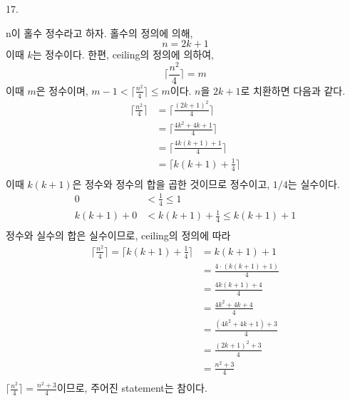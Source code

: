 \documentclass{article}
\begin{document}
17.
\begin{addmargin}[1em]{2em}
n이 홀수 정수라고 하자. 홀수의 정의에 의해,
\[n = 2k + 1\]
이때 $k$는 정수이다.
한편, ceiling의 정의에 의하여,
\[\lceil \frac{n^2}{4} \rceil = m \]
이때 $m$은 정수이며, $m - 1 < \lceil \frac{n^2}{4} \rceil \le m$이다.
$n$을 $2k+1$로 치환하면 다음과 같다.
\begin{align*}
    \lceil \frac{n^2}{4} \rceil &= \lceil \frac{(2k+1)^2}{4} \rceil \\
    &=\lceil \frac{4k^2+4k+1}{4} \rceil \\
    &=\lceil \frac{4k(k+1)+1}{4} \rceil \\
    &=\lceil k(k+1) + \frac{1}{4} \rceil \\
\end{align*}
이때 $k(k+1)$은 정수와 정수의 합을 곱한 것이므로 정수이고, $1/4$는 실수이다.
\begin{align*}
    0 &< \frac{1}{4} \le 1 \\
    k(k+1)+ 0 &< k(k+1) + \frac{1}{4} \le k(k+1)+1 \\
\end{align*}
정수와 실수의 합은 실수이므로, ceiling의 정의에 따라
\begin{align*}
    \lceil \frac{n^2}{4} \rceil = \lceil k(k+1) + \frac{1}{4} \rceil &= k(k+1) + 1 \\
    &= \frac{4\cdot(k(k+1)+1)}{4} \\
    &= \frac{4k(k+1)+4}{4} \\
    &= \frac{4k^2+4k+4}{4} \\
    &= \frac{(4k^2+4k+1)+3}{4} \\
    &= \frac{(2k+1)^2+3}{4} \\
    &= \frac{n^2+3}{4} \\
\end{align*}
$\lceil \frac{n^2}{4} \rceil = \frac{n^2+3}{4}$이므로, 주어진 statement는 참이다.
\end{addmargin}
\bigskip
\end{document}
